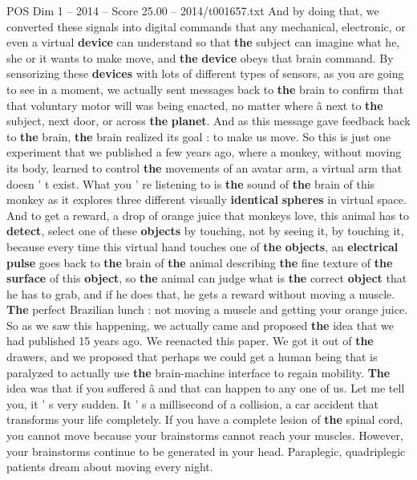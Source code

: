 \begin{textsample}{POS Dim 1 – 2014 – Score 25.00 – 2014/t001657.txt}
And by doing that, we converted these signals into digital commands that any mechanical, electronic, or even a virtual \textbf{device} can understand so that \textbf{the} subject can imagine what he, she or it wants to make move, and \textbf{the} \textbf{device} obeys that brain command.
By sensorizing these \textbf{devices} with lots of different types of sensors, as you are going to see in a moment, we actually sent messages back to \textbf{the} brain to confirm that that voluntary motor will was being enacted, no matter where â next to \textbf{the} subject, next door, or across \textbf{the} \textbf{planet}.
And as this message gave feedback back to \textbf{the} brain, \textbf{the} brain realized its goal : to make us move.
So this is just one experiment that we published a few years ago, where a monkey, without moving its body, learned to control \textbf{the} movements of an avatar arm, a virtual arm that doesn ' t exist.
What you ' re listening to is \textbf{the} sound of \textbf{the} brain of this monkey as it explores three different visually \textbf{identical} \textbf{spheres} in virtual space.
And to get a reward, a drop of orange juice that monkeys love, this animal has to \textbf{detect}, select one of these \textbf{objects} by touching, not by seeing it, by touching it, because every time this virtual hand touches one of \textbf{the} \textbf{objects}, an \textbf{electrical} \textbf{pulse} goes back to \textbf{the} brain of \textbf{the} animal describing \textbf{the} fine texture of \textbf{the} \textbf{surface} of this \textbf{object}, so \textbf{the} animal can judge what is \textbf{the} correct \textbf{object} that he has to grab, and if he does that, he gets a reward without moving a muscle. \textbf{The} perfect Brazilian lunch : not moving a muscle and getting your orange juice.
So as we saw this happening, we actually came and proposed \textbf{the} idea that we had published 15 years ago.
We reenacted this paper.
We got it out of \textbf{the} drawers, and we proposed that perhaps we could get a human being that is paralyzed to actually use \textbf{the} brain-machine interface to regain mobility. \textbf{The} idea was that if you suffered â and that can happen to any one of us.
Let me tell you, it ' s very sudden.
It ' s a millisecond of a collision, a car accident that transforms your life completely.
If you have a complete lesion of \textbf{the} spinal cord, you cannot move because your brainstorms cannot reach your muscles.
However, your brainstorms continue to be generated in your head.
Paraplegic, quadriplegic patients dream about moving every night.

\end{textsample}
